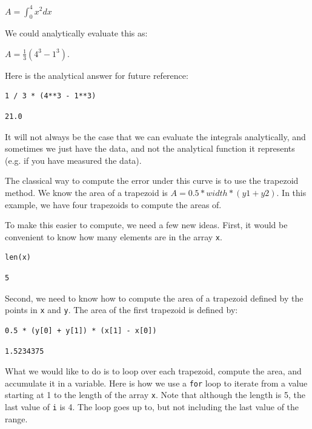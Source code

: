 \documentclass[11pt]{article}
\begin{document}
\(A = \int_0^4 x^2 dx\)

We could analytically evaluate this as:

\(A = \frac{1}{3} (4^3 - 1^3)\).

Here is the analytical answer for future reference:

\begin{verbatim}
1 / 3 * (4**3 - 1**3)
\end{verbatim}

\begin{verbatim}
21.0
\end{verbatim}

It will not always be the case that we can evaluate the integrals analytically, and sometimes we just have the data, and not the analytical function it represents (e.g. if you have measured the data).


The classical way to compute the error under this curve is to use the trapezoid method. We know the area of a trapezoid is \(A = 0.5 * width * (y1 + y2)\). In this example, we have four trapezoids to compute the areas of.

To make this easier to compute, we need a few new ideas. First, it would be convenient to know how many elements are in the array \texttt{x}.

\begin{verbatim}
len(x)
\end{verbatim}

\begin{verbatim}
5
\end{verbatim}

Second, we need to know how to compute the area of a trapezoid defined by the points in \texttt{x} and \texttt{y}. The area of the first trapezoid is defined by:

\begin{verbatim}
0.5 * (y[0] + y[1]) * (x[1] - x[0])
\end{verbatim}

\begin{verbatim}
1.5234375
\end{verbatim}

What we would like to do is to loop over each trapezoid, compute the area, and accumulate it in a variable. Here is how we use a \texttt{for} loop to iterate from a value starting at 1 to the length of the array \texttt{x}. Note that although the length is 5, the last value of \texttt{i} is 4. The loop goes up to, but not including the last value of the range.
\end{document}
